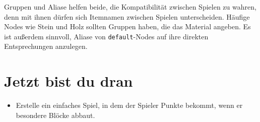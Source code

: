 Gruppen und Aliase helfen beide,
die Kompatibilität zwischen Spielen zu wahren, denn mit ihnen dürfen
sich Itemnamen zwischen Spielen unterscheiden. Häufige Nodes wie Stein
und Holz sollten Gruppen haben, die das Material angeben. Es ist
außerdem sinnvoll, Aliase von \texttt{default}-Nodes auf ihre direkten
Entsprechungen anzulegen.

\section{Jetzt bist du dran}\label{jetzt-bist-du-dran}

\begin{itemize}
\tightlist
\item
  Erstelle ein einfaches Spiel, in dem der Spieler Punkte bekommt, wenn
  er besondere Blöcke abbaut.
\end{itemize}

